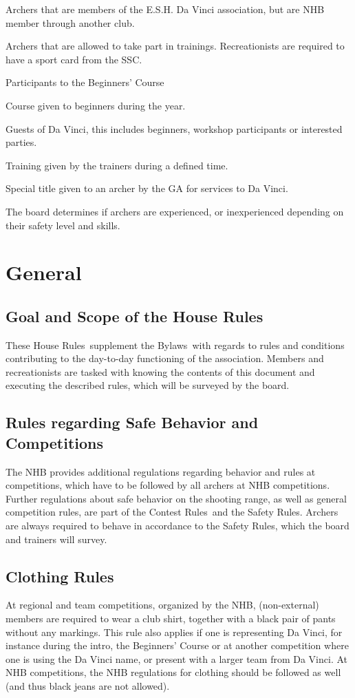 \documentclass[a4paper]{article}
\newcommand{\Asta}{Bylaws} %
\newcommand{\Ahr}{House Rules} %
\newcommand{\Asr}{Safety Rules} %
\newcommand{\Awr}{Contest Rules} %
\begin{document}
\begin{description}[font=\sffamily\bfseries, leftmargin=1cm, style=nextline]
Archers that are members of the E.S.H. Da Vinci association, but are NHB member through another club.
\item[Recreationist]
Archers that are allowed to take part in trainings. Recreationists are required to have a sport card from the SSC.
\item[Beginner]
Participants to the Beginners' Course
\item[Beginners' Course] Course given to beginners during the year.
\item[Guest] Guests of Da Vinci, this includes beginners, workshop participants or interested parties.
\item[General Training] Training given by the trainers during a defined time.
\item[Honorary Member] Special title given to an archer by the GA for services to Da Vinci.
\item[Experienced - Inexperienced] The board determines if archers are experienced, or inexperienced depending on their safety level and skills.
\end{description}


\section{General}
\subsection{Goal and Scope of the \Ahr}
These \Ahr\ supplement the \Asta\ with regards to rules and conditions contributing to the day-to-day functioning of the association. Members and recreationists are tasked with knowing the contents of this document and executing the described rules, which will be surveyed by the board.

\subsection{Rules regarding Safe Behavior and Competitions}
The NHB provides additional regulations regarding behavior and rules at competitions, which have to be followed by all archers at NHB competitions. Further regulations about safe behavior on the shooting range, as well as general competition rules, are part of the \Awr\ and the \Asr . Archers are always required to behave in accordance to the \Asr , which the board and trainers will survey.

\subsection{Clothing Rules}
At regional and team competitions, organized by the NHB, (non-external) members are required to wear a club shirt, together with a black pair of pants without any markings. This rule also applies if one is representing Da Vinci, for instance during the intro, the Beginners' Course or at another competition where one is using the Da Vinci name, or present with a larger team from Da Vinci. At NHB competitions, the NHB regulations for clothing should be followed as well (and thus black jeans are not allowed).
\end{document}
